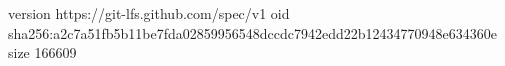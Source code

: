 version https://git-lfs.github.com/spec/v1
oid sha256:a2c7a51fb5b11be7fda02859956548dccdc7942edd22b12434770948e634360e
size 166609
